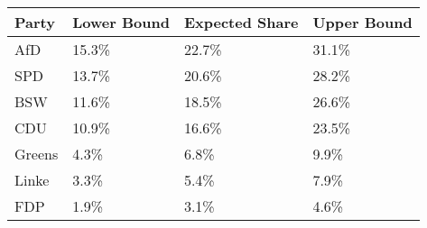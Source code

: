 \begin{tabular}{llll}
  \hline
Party & Lower Bound & Expected Share & Upper Bound \\ 
  \hline
AfD & 15.3\% & 22.7\% & 31.1\% \\ 
  SPD & 13.7\% & 20.6\% & 28.2\% \\ 
  BSW & 11.6\% & 18.5\% & 26.6\% \\ 
  CDU & 10.9\% & 16.6\% & 23.5\% \\ 
  Greens & 4.3\% & 6.8\% & 9.9\% \\ 
  Linke & 3.3\% & 5.4\% & 7.9\% \\ 
  FDP & 1.9\% & 3.1\% & 4.6\% \\ 
   \hline
\end{tabular}
